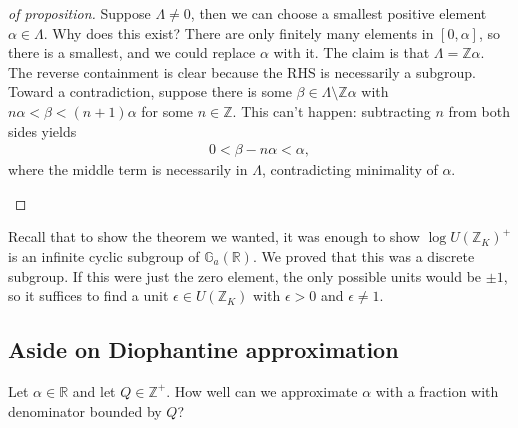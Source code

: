 \begin{proof}[of proposition]

Suppose \(\Lambda \neq 0\), then we can choose a smallest positive
element \(\alpha\in \Lambda\). Why does this exist? There are only
finitely many elements in \([0, \alpha]\), so there is a smallest, and
we could replace \(\alpha\) with it. The claim is that
\(\Lambda = {\mathbb{Z}}\alpha\). The reverse containment is clear
because the RHS is necessarily a subgroup. Toward a contradiction,
suppose there is some \(\beta\in \Lambda\setminus{\mathbb{Z}}\alpha\)
with \(n \alpha < \beta < (n+1) \alpha\) for some \(n\in {\mathbb{Z}}\).
This can't happen: subtracting \(n\) from both sides yields
\begin{align*}
0 < \beta - n \alpha < \alpha
,\end{align*}
where the middle term is necessarily in \(\Lambda\), contradicting
minimality of \(\alpha\).

\begin{figure}
\centering
{}
\end{figure}

\end{proof}

\begin{remark}

Recall that to show the theorem we wanted, it was enough to show
\(\log U({\mathbb{Z}}_K)^+\) is an infinite cyclic subgroup of
\({\mathbb{G}}_a({\mathbb{R}})\). We proved that this was a discrete
subgroup. If this were just the zero element, the only possible units
would be \(\pm 1\), so it suffices to find a unit
\(\epsilon \in U({\mathbb{Z}}_K)\) with \(\epsilon>0\) and
\(\epsilon\neq 1\).

\end{remark}

\hypertarget{aside-on-diophantine-approximation}{%
\subsection{Aside on Diophantine
approximation}\label{aside-on-diophantine-approximation}}

\begin{remark}

Let \(\alpha\in {\mathbb{R}}\) and let \(Q \in {\mathbb{Z}}^+\). How
well can we approximate \(\alpha\) with a fraction with denominator
bounded by \(Q\)?

\end{remark}

